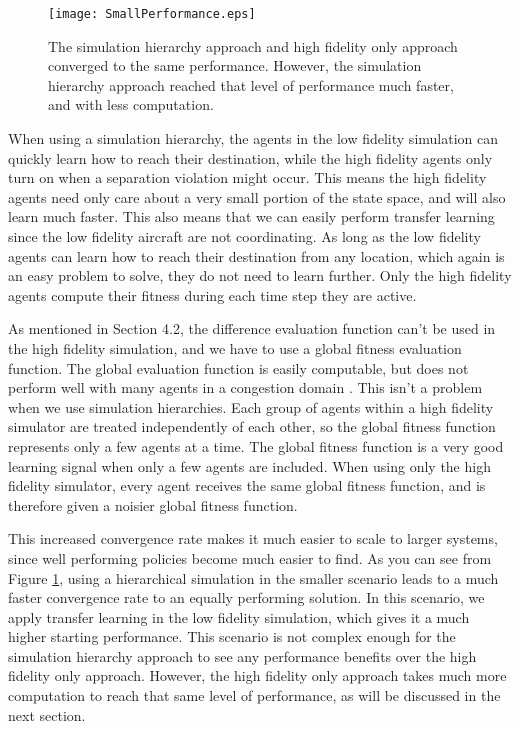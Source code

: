 \documentclass{sig-alternate}
\begin{document}
\begin{figure}
\centering
\texttt{[image: SmallPerformance.eps]}
\caption{The simulation hierarchy approach and high fidelity only approach converged to the same performance. However, the simulation hierarchy approach reached that level of performance much faster, and with less computation.}
\label{fig:12Performance}
\end{figure}


When using a simulation hierarchy, the agents in the low fidelity simulation can quickly learn how to reach their destination, while the high fidelity agents only turn on when a separation violation might occur. This means the high fidelity agents need only care about a very small portion of the state space, and will also learn much faster. This also means that we can easily perform transfer learning since the low fidelity aircraft are not coordinating. As long as the low fidelity agents can learn how to reach their destination from any location, which again is an easy problem to solve, they do not need to learn further. Only the high fidelity agents compute their fitness during each time step they are active.

As mentioned in Section 4.2, the difference evaluation function can't be used in the high fidelity simulation, and we have to use a global fitness evaluation function. The global evaluation function is easily computable, but does not perform well with many agents in a congestion domain \cite{AAMAS12-agmon, Colby:2012:SFF:2343576.2343637, tumer-agogino_jaamas12}. This isn't a problem when we use simulation hierarchies. Each group of agents within a high fidelity simulator are treated independently of each other, so the global fitness function represents only a few agents at a time. The global fitness function is a very good learning signal when only a few agents are included. When using only the high fidelity simulator, every agent receives the same global fitness function, and is therefore given a noisier global fitness function. 

This increased convergence rate makes it much easier to scale to larger systems, since well performing policies become much easier to find. As you can see from Figure \ref{fig:12Performance}, using a hierarchical simulation in the smaller scenario leads to a much faster convergence rate to an equally performing solution. In this scenario, we apply transfer learning in the low fidelity simulation, which gives it a much higher starting performance. This scenario is not complex enough for the simulation hierarchy approach to see any performance benefits over the high fidelity only approach. However, the high fidelity only approach takes much more computation to reach that same level of performance, as will be discussed in the next section.
\end{document}
